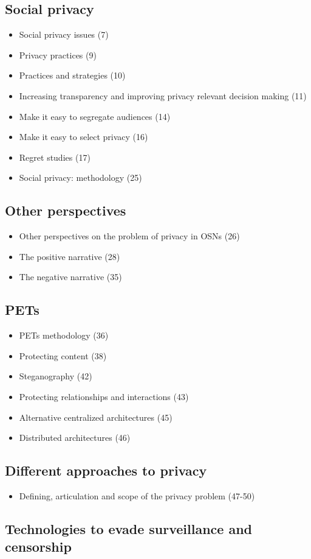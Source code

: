 \documentclass[../overview.tex]{subfiles}
\begin{document}
\subsection{Social privacy}
\begin{itemize}
	\item Social privacy issues (7)
	\item Privacy practices (9)
	\item Practices and strategies (10)
	\item Increasing transparency and improving privacy relevant decision making (11)
	\item Make it easy to segregate audiences (14)
	\item Make it easy to select privacy (16)
	\item Regret studies (17)
	\item Social privacy: methodology (25)
\end{itemize}

\subsection{Other perspectives}
\begin{itemize}
	\item Other perspectives on the problem of privacy in OSNs (26)
	\item The positive narrative (28)
	\item The negative narrative (35)
\end{itemize}

\subsection{PETs}
\begin{itemize}
	\item PETs methodology (36)
	\item Protecting content (38)
	\item Steganography (42)
	\item Protecting relationships and interactions (43)
	\item Alternative centralized architectures (45)
	\item Distributed architectures (46)
\end{itemize}

\subsection{Different approaches to privacy}
\begin{itemize}
	\item Defining, articulation and scope of the privacy problem (47-50)
\end{itemize}

\subsection{Technologies to evade surveillance and censorship}
\end{document}

